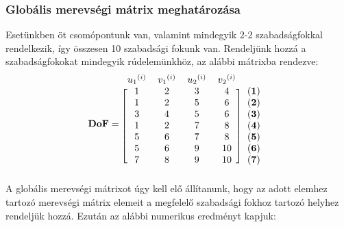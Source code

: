\documentclass[12pt,a4paper]{article}
\def\mx#1{\mathbf{#1}}
\def\i{\left(i\right)}
\begin{document}
\subsubsection{Globális merevségi mátrix meghatározása}
Esetünkben öt csomópontunk van, valamint mindegyik 2-2 szabadságfokkal rendelkezik,
így összesen 10 szabadsági fokunk van.
Rendeljünk hozzá a szabadságfokokat mindegyik rúdelemünkhöz, az alábbi mátrixba rendezve:
\begin{equation}
    \mx{DoF}=
    \begin{blockarray}{ccccc}
        {u_1}^{\i} & {v_1}^{\i} & {u_2}^{\i} & {v_2}^{\i} \\
        \begin{block}{[cccc]c}
            1 & 2 & 3 & 4 & \left(\mathbf{1}\right) \\
            1 & 2 & 5 & 6 & \left(\mathbf{2}\right) \\
            3 & 4 & 5 & 6 & \left(\mathbf{3}\right) \\
            1 & 2 & 7 & 8 & \left(\mathbf{4}\right) \\
            5 & 6 & 7 & 8 & \left(\mathbf{5}\right) \\
            5 & 6 & 9 & 10 & \left(\mathbf{6}\right) \\
            7 & 8 & 9 & 10 & \left(\mathbf{7}\right) \\
        \end{block}
    \end{blockarray}
\end{equation}
A globális merevségi mátrixot úgy kell elő állítanunk, hogy
az adott elemhez tartozó merevségi mátrix elemeit a megfelelő szabadsági
fokhoz tartozó helyhez rendeljük hozzá. Ezután az alábbi numerikus eredményt kapjuk:
\end{document}
